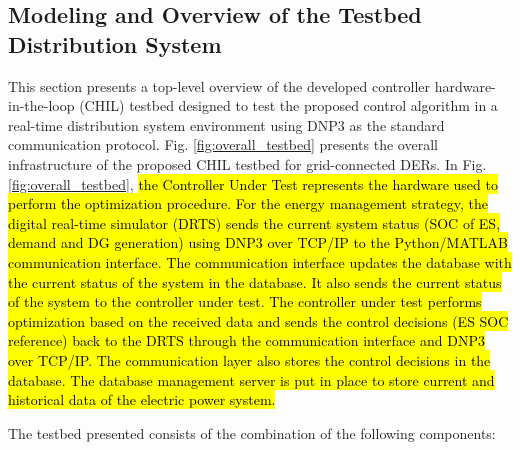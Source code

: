 \subsection{Modeling and Overview of the Testbed Distribution System}
This section presents a top-level overview of the developed controller hardware-in-the-loop (CHIL) testbed designed to test the proposed control algorithm in a real-time distribution system environment using DNP3 as the standard communication protocol. Fig. \ref{fig:overall_testbed} presents the overall infrastructure of the proposed CHIL testbed for grid-connected DERs. In Fig. \ref{fig:overall_testbed}, \hl{the Controller Under Test represents the hardware used to perform the optimization procedure. For the energy management strategy, the digital real-time simulator (DRTS) sends the current system status (SOC of ES, demand and DG generation) using DNP3 over TCP/IP to the Python/MATLAB communication interface. The communication interface updates the database with the current status of the system in the database. It also sends the current status of the system to the controller under test. The controller under test performs optimization based on the received data and sends the control decisions (ES SOC reference) back to the DRTS through the communication interface and DNP3 over TCP/IP. The communication layer also stores the control decisions in the database. The database management server is put in place to store current and historical data of the electric power system.}

The testbed presented consists of the combination of the following components:

